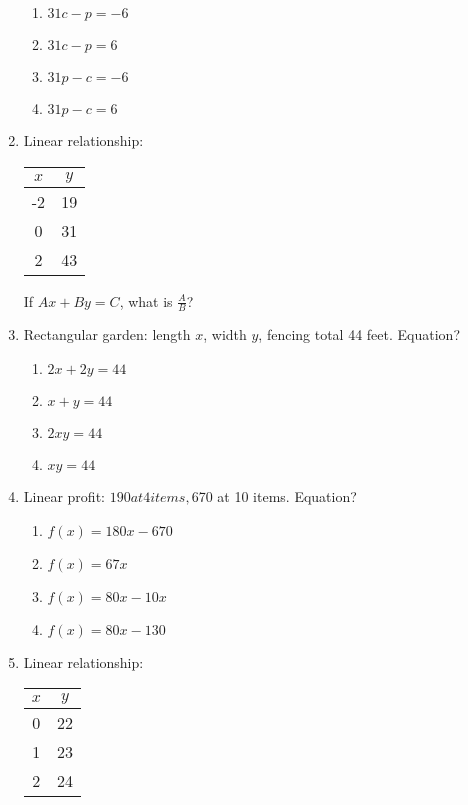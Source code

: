 \documentclass[12pt]{exam}
\begin{document}
\begin{enumerate}
\begin{enumerate}[label=\Alph*)]
        \item $31c - p = -6$
        \item $31c - p = 6$
        \item $31p - c = -6$
        \item $31p - c = 6$
    \end{enumerate}
    \item Linear relationship:
    \begin{center}
        \begin{tabular}{|c|c|}
            \hline
            $x$ & $y$ \\
            \hline
            -2 & 19 \\
            0 & 31 \\
            2 & 43 \\
            \hline
        \end{tabular}
    \end{center}
    If $Ax + By = C$, what is $\frac{A}{B}$?
    \item Rectangular garden: length $x$, width $y$, fencing total 44 feet. Equation?
    \begin{enumerate}[label=\Alph*)]
        \item $2x + 2y = 44$
        \item $x + y = 44$
        \item $2xy = 44$
        \item $xy = 44$
    \end{enumerate}
    \item Linear profit: $190 at 4 items, $670 at 10 items. Equation?
    \begin{enumerate}[label=\Alph*)]
        \item $f(x) = 180x - 670$
        \item $f(x) = 67x$
        \item $f(x) = 80x - 10x$
        \item $f(x) = 80x - 130$
    \end{enumerate}
    \item Linear relationship:
    \begin{center}
        \begin{tabular}{|c|c|}
            \hline
            $x$ & $y$ \\
            \hline
            0 & 22 \\
            1 & 23 \\
            2 & 24 \\

\end{tabular}
\end{center}
\end{enumerate}
\end{document}
